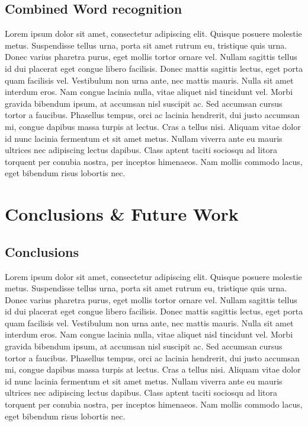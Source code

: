 \documentclass[12pt]{article}
\begin{document}
	\subsection{Combined Word recognition}
	Lorem ipsum dolor sit amet, consectetur adipiscing elit. Quisque posuere molestie metus. Suspendisse tellus urna, porta sit amet rutrum eu, tristique quis urna. Donec varius pharetra purus, eget mollis tortor ornare vel. Nullam sagittis tellus id dui placerat eget congue libero facilisis. Donec mattis sagittis lectus, eget porta quam facilisis vel. Vestibulum non urna ante, nec mattis mauris. Nulla sit amet interdum eros. Nam congue lacinia nulla, vitae aliquet nisl tincidunt vel. Morbi gravida bibendum ipsum, at accumsan nisl suscipit ac. Sed accumsan cursus tortor a faucibus. Phasellus tempus, orci ac lacinia hendrerit, dui justo accumsan mi, congue dapibus massa turpis at lectus. Cras a tellus nisi. Aliquam vitae dolor id nunc lacinia fermentum et sit amet metus. Nullam viverra ante eu mauris ultrices nec adipiscing lectus dapibus. Class aptent taciti sociosqu ad litora torquent per conubia nostra, per inceptos himenaeos. Nam mollis commodo lacus, eget bibendum risus lobortis nec.
	
\section{Conclusions \& Future Work}
\label{section:conclusion}
	\subsection{Conclusions}
	Lorem ipsum dolor sit amet, consectetur adipiscing elit. Quisque posuere molestie metus. Suspendisse tellus urna, porta sit amet rutrum eu, tristique quis urna. Donec varius pharetra purus, eget mollis tortor ornare vel. Nullam sagittis tellus id dui placerat eget congue libero facilisis. Donec mattis sagittis lectus, eget porta quam facilisis vel. Vestibulum non urna ante, nec mattis mauris. Nulla sit amet interdum eros. Nam congue lacinia nulla, vitae aliquet nisl tincidunt vel. Morbi gravida bibendum ipsum, at accumsan nisl suscipit ac. Sed accumsan cursus tortor a faucibus. Phasellus tempus, orci ac lacinia hendrerit, dui justo accumsan mi, congue dapibus massa turpis at lectus. Cras a tellus nisi. Aliquam vitae dolor id nunc lacinia fermentum et sit amet metus. Nullam viverra ante eu mauris ultrices nec adipiscing lectus dapibus. Class aptent taciti sociosqu ad litora torquent per conubia nostra, per inceptos himenaeos. Nam mollis commodo lacus, eget bibendum risus lobortis nec.
\end{document}

